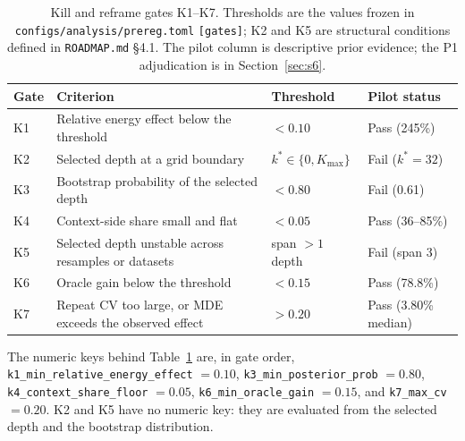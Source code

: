 \begin{table}[pos=htbp]
  \centering
  \caption{Kill and reframe gates K1--K7. Thresholds are the values frozen in
  \texttt{configs/analysis/prereg.toml} \texttt{[gates]}; K2 and K5 are structural conditions
  defined in \texttt{ROADMAP.md} \S4.1. The pilot column is descriptive prior evidence; the P1
  adjudication is in Section~\ref{sec:s6}.}
  \label{tab:kgates}
  \small
  \begin{tabularx}{\textwidth}{>{\raggedright\arraybackslash}p{0.9cm}>{\raggedright\arraybackslash}p{6.3cm}>{\raggedright\arraybackslash}p{3.0cm}>{\raggedright\arraybackslash}X}
    \toprule
    \textbf{Gate} & \textbf{Criterion} & \textbf{Threshold} & \textbf{Pilot status} \\
    \midrule
    K1 & Relative energy effect below the threshold & $<0.10$ & Pass (245\%) \\
    K2 & Selected depth at a grid boundary & $k^{*}\in\{0,K_{\max}\}$ & Fail ($k^{*}=32$) \\
    K3 & Bootstrap probability of the selected depth & $<0.80$ & Fail (0.61) \\
    K4 & Context-side share small and flat & $<0.05$ & Pass (36--85\%) \\
    K5 & Selected depth unstable across resamples or datasets & span $>1$ depth & Fail (span 3) \\
    K6 & Oracle gain below the threshold & $<0.15$ & Pass (78.8\%) \\
    K7 & Repeat CV too large, or MDE exceeds the observed effect & $>0.20$ & Pass (3.80\% median) \\
    \bottomrule
  \end{tabularx}
\end{table}

The numeric keys behind Table~\ref{tab:kgates} are, in gate order,
\texttt{k1\_min\_relative\_energy\_effect} $=0.10$,
\texttt{k3\_min\_posterior\_prob} $=0.80$,
\texttt{k4\_context\_share\_floor} $=0.05$,
\texttt{k6\_min\_oracle\_gain} $=0.15$, and
\texttt{k7\_max\_cv} $=0.20$. K2 and K5 have no numeric key: they are evaluated from the
selected depth and the bootstrap distribution.

